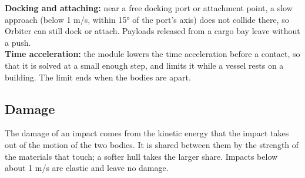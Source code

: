 \documentclass[Orbiter User Manual.tex]{subfiles}
\begin{document}
\noindent
\textbf{Docking and attaching:} near a free docking port or attachment point, a slow approach (below 1 m/s, within 15° of the port's axis) does not collide there, so Orbiter can still dock or attach. Payloads released from a cargo bay leave without a push.\\
\textbf{Time acceleration:} the module lowers the time acceleration before a contact, so that it is solved at a small enough step, and limits it while a vessel rests on a building. The limit ends when the bodies are apart.


\subsection{Damage}
The damage of an impact comes from the kinetic energy that the impact takes out of the motion of the two bodies. It is shared between them by the strength of the materials that touch; a softer hull takes the larger share. Impacts below about 1 m/s are elastic and leave no damage.
\end{document}
